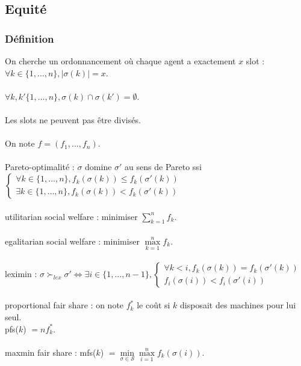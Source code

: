 \documentclass[12pt]{article}
\theoremstyle{definition}
\begin{document}
\newpage

\subsection{Equité}\label{equite}
\subsubsection{Définition}
\noindent
On cherche un ordonnancement où chaque agent a exactement $x$ slot : $\forall k \in \lbrace 1, \dots , n \rbrace, |\sigma(k)| = x$.\\\\
$\forall k, k' \lbrace 1, \dots , n \rbrace, \sigma(k)\cap\sigma(k') = \emptyset$.\\\\
Les slots ne peuvent pas être divisés.\\\\
On note $f = (f_1, \dots, f_n)$.\\\\
Pareto-optimalité : $\sigma$ domine $\sigma'$ au sens de Pareto ssi \\
$\left\{
\begin{array}{l}
  \forall k \in \lbrace1, \dots,n\rbrace,f_k(\sigma(k))\leq f_k(\sigma'(k)) \\
  \exists k \in \lbrace1, \dots,n\rbrace,f_k(\sigma(k))< f_k(\sigma'(k))
\end{array}
\right.$\\\\
utilitarian social welfare : minimiser $\sum\limits_{k = 1}^n f_k$.\\\\
egalitarian social welfare : minimiser $\max\limits_{k = 1}^n f_k$.\\\\
leximin : $\sigma \succ_{lex}\sigma' \iff \exists i\in \lbrace1, \dots,n-1\rbrace,
\left\{
\begin{array}{l}
  \forall k < i ,f_k(\sigma(k)) = f_k(\sigma'(k))\\
  f_i(\sigma(i)) < f_i(\sigma'(i))
\end{array}
\right.$\\\\
proportional fair share : on note $f_k^*$ le coût si $k$ disposait des machines pour lui seul.\\ pfs($k$) $ = nf_k^*$.\\\\
maxmin fair share : mfs($k$) $= \min\limits_{\sigma\in\mathscr{S}}\max\limits_{i=1}^n f_k(\sigma(i))$.\\\\
\end{document}
